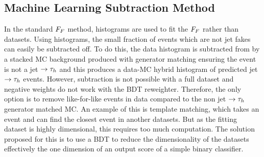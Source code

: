 \subsection{Machine Learning Subtraction Method}

In the standard $F_{F}$ method, histograms are used to fit the $F_{F}$ rather than datasets. 
Using histograms, the small fraction of events which are not jet fakes can easily be subtracted off. 
To do this, the data histogram is subtracted from by a stacked \ac{MC} background produced with generator matching ensuring the event is not a jet $\rightarrow\tau_{h}$ and this produces a data-\ac{MC} hybrid histogram of predicted jet $\rightarrow\tau_{h}$ events.
However, subtraction is not possible with a full dataset and negative weights do not work with the \ac{BDT} reweighter. 
Therefore, the only option is to remove like-for-like events in data compared to the non jet $\rightarrow\tau_{h}$ generator matched MC.
An example of this is template matching, which takes an event and can find the closest event in another datasets.
But as the fitting dataset is highly dimensional, this requires too much computation.
The solution proposed for this is to use a \ac{BDT} to reduce the dimensionality of the datasets effectively the one dimension of an output score of a simple binary classifier. \\

